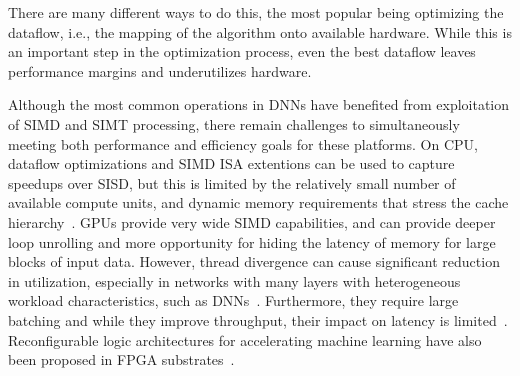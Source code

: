 


There are many different ways to do this, the most popular being optimizing the dataflow, i.e., the mapping of the algorithm onto available hardware.
While this is an important step in the optimization process, even the best dataflow leaves performance margins and underutilizes hardware\cn.

Although the most common operations in DNNs have benefited from exploitation of SIMD and SIMT processing, there remain challenges to simultaneously meeting both performance and efficiency goals for these platforms.
On CPU, dataflow optimizations and SIMD ISA extentions can be used to capture speedups over SISD, but this is  limited by the relatively small number of available compute units, and dynamic memory requirements that stress the cache hierarchy~\cite{vanhoucke2011improving}.
GPUs provide very wide SIMD capabilities, and can provide deeper loop unrolling and more opportunity for hiding the latency of memory for large blocks of input data.
However, thread divergence can cause significant reduction in utilization, especially in networks with many layers with heterogeneous workload characteristics, such as DNNs~\cite{hill2017deftnn}.
Furthermore, they require large batching and while they improve throughput, their impact on latency is limited~\cite{jouppi2017datacenter}.
Reconfigurable logic architectures for accelerating machine learning have also been proposed in FPGA substrates~\cite{putnam2014reconfigurable, ovtcharov2015accelerating, caulfield2016cloudscale, chung2017accelerating}.

